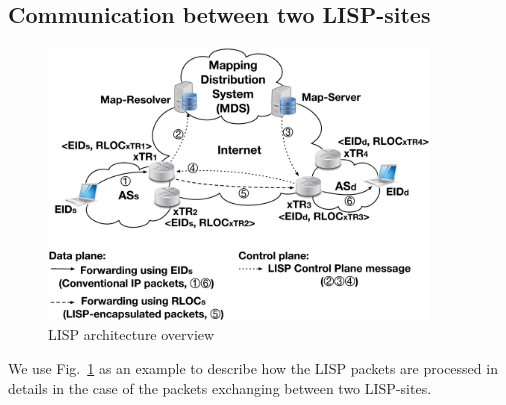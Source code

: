 \subsection{Communication between two LISP-sites}
\label{sec:communication_2_lisp}
\begin{figure}[!t]
	\centering
	\includegraphics[width=0.9\textwidth]{Pics/LISP_D_C_planes.eps}
	\caption{LISP architecture overview}
	\label{LISP_archi}
\end{figure}
We use Fig.~\ref{LISP_archi} as an example to describe how the LISP packets are processed in details in the case of the packets exchanging between two LISP-sites.

